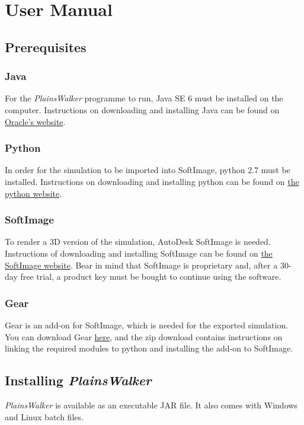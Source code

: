 \section{User Manual}

\subsection{Prerequisites}
\subsubsection{Java}
For the \emph{PlainsWalker} programme to run, Java SE 6 must be installed on the computer. Instructions on downloading and installing Java can be found on  \href{http://www.oracle.com/technetwork/java/javase/downloads/index.html}{Oracle's website}. 

\subsubsection{Python}
In order for the simulation to be imported into SoftImage, python 2.7 must be installed. Instructions on downloading and installing python can be found on  \href{http://www.python.org/download/}{the python website}.

\subsubsection{SoftImage}
To render a 3D version of the simulation, AutoDesk SoftImage is needed. Instructions of downloading and installing SoftImage can be found on  \href{http://usa.autodesk.com/adsk/servlet/pc/index?id=13571168&siteID=123112}{the SoftImage website}. Bear in mind that SoftImage is proprietary and, after a 30-day free trial, a product key must be bought to continue using the software.

\subsubsection{Gear}
Gear is an add-on for SoftImage, which is needed for the exported simulation. You can download Gear \href{http://opensource.studionestbarcelona.com/gear.html}{here}, and the zip download contains instructions on linking the required modules to python and installing the add-on to SoftImage.

\subsection{Installing \emph{PlainsWalker}}
\emph{PlainsWalker} is available as an executable JAR file. It also comes with Windows and Linux batch files.


